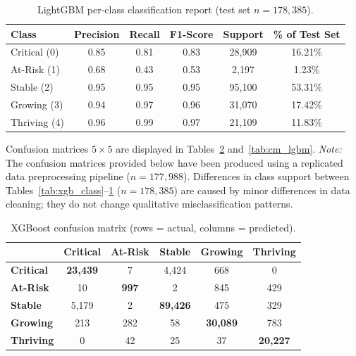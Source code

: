 \begin{table}[htbp]
\centering
\caption{LightGBM per-class classification report (test set $n = 178{,}385$).}
\label{tab:lgbm_class}
\begin{tabular}{lccccc}
\hline
\textbf{Class} & \textbf{Precision} & \textbf{Recall} & \textbf{F1-Score} & \textbf{Support} & \textbf{\% of Test Set} \\
\hline
Critical (0) & 0.85 & 0.81 & 0.83 & 28,909 & 16.21\% \\
At-Risk (1) & 0.68 & 0.43 & 0.53 & 2,197 & 1.23\% \\
Stable (2) & 0.95 & 0.95 & 0.95 & 95,100 & 53.31\% \\
Growing (3) & 0.94 & 0.97 & 0.96 & 31,070 & 17.42\% \\
Thriving (4) & 0.96 & 0.99 & 0.97 & 21,109 & 11.83\% \\
\hline
\end{tabular}
\end{table}

Confusion matrices $5 \times 5$ are displayed in Tables~\ref{tab:cm_xgb} and~\ref{tab:cm_lgbm}. \textit{Note:} The confusion matrices provided below have been produced using a replicated data preprocessing pipeline ($n = 177{,}988$). Differences in class support between Tables~\ref{tab:xgb_class}--\ref{tab:lgbm_class} ($n = 178{,}385$) are caused by minor differences in data cleaning; they do not change qualitative misclassification patterns.

\begin{table}[htbp]
\centering
\caption{XGBoost confusion matrix (rows = actual, columns = predicted).}
\label{tab:cm_xgb}
\begin{tabular}{lccccc}
\hline
& \textbf{Critical} & \textbf{At-Risk} & \textbf{Stable} & \textbf{Growing} & \textbf{Thriving} \\
\hline
\textbf{Critical} & \textbf{23,439} & 7 & 4,424 & 668 & 0 \\
\textbf{At-Risk} & 10 & \textbf{997} & 2 & 845 & 429 \\
\textbf{Stable} & 5,179 & 2 & \textbf{89,426} & 475 & 329 \\
\textbf{Growing} & 213 & 282 & 58 & \textbf{30,089} & 783 \\
\textbf{Thriving} & 0 & 42 & 25 & 37 & \textbf{20,227} \\
\hline
\end{tabular}
\end{table}


